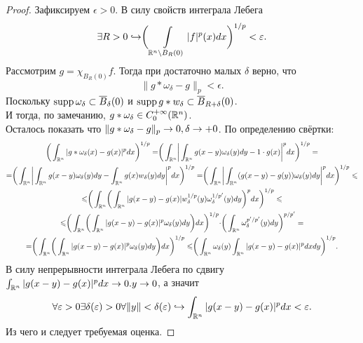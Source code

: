 \begin{proof}
    Зафиксируем $\epsilon > 0$.
    В силу свойств интеграла Лебега
    \[
        \exists R > 0 \hookrightarrow \biggr(\int\limits_{\mathbb{R}^n \setminus B_R(0)}|f|^p(x)dx \biggr)^{1/p} < \varepsilon.
    \]
    Рассмотрим $g = \chi_{B_R(0)}f$.
    Тогда при достаточно малых $\delta$ верно, что
    \[
        \|g * \omega_\delta - g\|_p < \epsilon.
    \]
    Поскольку $\operatorname{supp} \omega_\delta \subset \overline{B}_\delta(0)$ и $\operatorname{supp} g * w_\delta \subset \overline{B}_{R + \delta}(0)$. \\
    И тогда, по замечанию, $g * \omega_\delta \in C^{+\infty}_0(\mathbb{R}^n)$. \\
    Осталось показать что $\|g * \omega_\delta - g\|_p \rightarrow 0, \delta \rightarrow +0$.
    По определению свёртки:
    \begin{multline*}
        \biggr(\int_{\mathbb{R}^n} |g * \omega_\delta(x) - g(x)|^pdx \biggr)^{1/p} = \biggr(\int_{\mathbb{R}^n} \biggr|\int_{\mathbb{R}^n} g(x - y)\omega_{\delta}(y)dy - 1 \cdot g(x)\biggr|^p dx \biggr)^{1/p} =
        \\ = \biggr(\int_{\mathbb{R}^n} \biggr|\int_{\mathbb{R}^n} g(x - y)\omega_\delta(y)dy - \int_{\mathbb{R}^n}g(x)w_\delta(y)dy \biggr|^p dx \biggr)^{1/p} = \biggr(\int_{\mathbb{R}^n}\biggr|\int_{\mathbb{R}^n} (g(x - y) - g(y))\omega_{\delta}(y)dy\biggr|^p dx\biggr)^{1/p} \leqslant \\
        \leqslant \biggr( \int_{\mathbb{R}^n} \biggr( \int_{\mathbb{R}^n} |g(x - y) - g(x)|w_{\delta}^{1/p}(y)\omega_{\delta}^{1/p'}(y)dy \biggr)^p dx  \biggr)^{1/p} \leqslant
        \\ \leqslant \biggr(\int_{\mathbb{R}^n} \biggr(\int_{\mathbb{R}^n} |g(x - y) - g(x)|^p \omega_\delta(y)dy \biggr)dx \biggr)^{1/p} \cdot \biggr(\int_{\mathbb{R}^n} \omega_{\delta}^{p'/p'}(y)dy\biggr)^{p/p'} = \\
        = \biggr(\int_{\mathbb{R}^n} \biggr( \int_{\mathbb{R}^n} |g(x - y) - g(x)|^p \omega_\delta(y)dy \biggr) dx \biggr)^{1/p} \leqslant \biggr(\int_{\mathbb{R}^n}  \omega_\delta(y) \int_{\mathbb{R}^n}|g(x - y) - g(x)|^p dx dy\biggr)^{1/p}.
    \end{multline*}
    В силу непрерывности интеграла Лебега по сдвигу $\int_{\mathbb{R}^n} |g(x - y) - g(x)|^p dx \rightarrow 0. y \rightarrow 0$, а значит
    \[
        \forall \varepsilon > 0 \exists \delta(\varepsilon) > 0 \forall \|y\| < \delta(\varepsilon) \hookrightarrow \int_{\mathbb{R}^n} |g(x - y) - g(x)|^p dx < \varepsilon.
    \]
    Из чего и следует требуемая оценка.
\end{proof}
